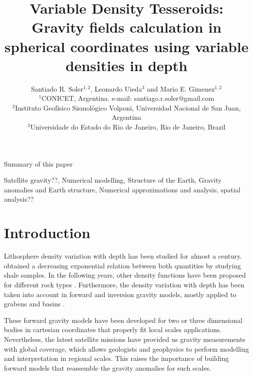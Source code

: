 \documentclass[extra]{gji}
\begin{document}
\title[Variable Density Tesseroids]{
    Variable Density Tesseroids: Gravity fields calculation in spherical coordinates using variable densities in depth
}
\author[S.R. Soler, L. Uieda and M.E. Gimenez]{
    Santiado R. Soler$^{1,2}$, Leonardo Uieda$^3$ and Mario E. Gimenez$^{1,2}$ \\
    $^1$CONICET, Argentina. e-mail: santiago.r.soler@gmail.com\\
    $^2$Instituto Geofísico Sismológico Volponi, Universidad Nacional de San Juan, Argentina\\
    $^3$Universidade do Estado do Rio de Janeiro, Rio de Janeiro, Brazil
    }


\maketitle

\begin{summary}
Summary of this paper 
\end{summary}

\begin{keywords}
Satellite gravity??, Numerical modelling, Structure of the Earth, Gravity anomalies and Earth structure, Numerical approximations and analysis, spatial analysis??
\end{keywords}


\section{Introduction}

Lithosphere density variation with depth has been studied for almost a century. 
\citet{Athy1930} obtained a decreasing exponential relation between both quantities by studying shale samples.
In the following years, other density functions have been proposed for different rock types \citep[e.g.,][]{Maxant1980, Rao1986, Rao1993, Rao1994}.
Furthermore, the density variation with depth has been taken into account in forward and inversion gravity models, mostly applied to grabens and basins \citep{Cordell1973, Rao1986, Cowie1990, Rao1993, Rao1994, Zhang2001, Welford2010}.

These forward gravity models have been developed for two or three dimensional bodies in cartesian coordinates that properly fit local scales applications.
Nevertheless, the latest satellite missions have provided us gravity measurements with global coverage, which allows geologists and geophysics to perform modelling and interpretation in regional scales.
This raises the importance of building forward models that reassemble the gravity anomalies for such scales.
\end{document}
